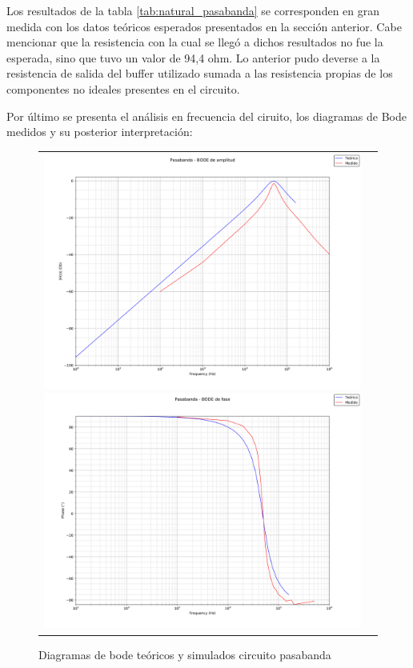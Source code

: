 Los resultados de la tabla \ref{tab:natural_pasabanda} se corresponden en gran medida con los datos te\'oricos esperados presentados en la secci\'on anterior. Cabe mencionar que la resistencia con la cual se lleg\'o a dichos resultados no fue la esperada, sino que tuvo un valor de   94,4 ohm. Lo anterior pudo deverse a la resistencia de salida del buffer utilizado sumada a las resistencia propias de los componentes no ideales presentes en el circuito. 


Por \'ultimo se presenta el an\'alisis en frecuencia del ciruito, los diagramas de Bode medidos y su posterior interpretaci\'on:

\begin{figure}[H]
    \centering
    \begin{tabular}{c c}
        \includegraphics[scale=0.3]{Recursos/ej4/pasabanda_amplitud.png}
        \includegraphics[scale=0.3]{Recursos/ej4/pasabanda_fase.png}
    \end{tabular}
    \caption{Diagramas de bode teóricos y simulados circuito pasabanda}
    \label{fig:bode_pasabanda}
\end{figure}

